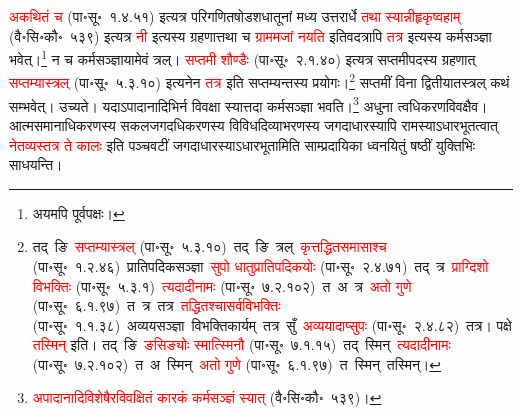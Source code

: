 \begin{sloppypar}
\textcolor{red}{अकथितं च} (पा॰सू॰~१.४.५१) इत्यत्र परिगणित\-षोडश\-धातूनां मध्य उत्तरार्धे \textcolor{red}{तथा स्यान्नीहृकृष्वहाम्‌} (वै॰सि॰कौ॰~५३९) इत्यत्र \textcolor{red}{नी} इत्यस्य ग्रहणात्तथा च \textcolor{red}{ग्राममजां नयति} इतिवदत्रापि \textcolor{red}{तत्र} इत्यस्य कर्म\-सञ्ज्ञा भवेत्।\footnote{अयमपि पूर्वपक्षः।} न च कर्म\-सञ्ज्ञायामेवं त्रल्। \textcolor{red}{सप्तमी शौण्डैः} (पा॰सू॰~२.१.४०) इत्यत्र सप्तमी\-पदस्य ग्रहणात् \textcolor{red}{सप्तम्यास्त्रल्‌} (पा॰सू॰~५.३.१०) इत्यनेन \textcolor{red}{तत्र} इति सप्तम्यन्तस्य प्रयोगः।\footnote{तद्~ङि~\arrow \textcolor{red}{सप्तम्यास्त्रल्‌} (पा॰सू॰~५.३.१०)~\arrow तद्~ङि~त्रल्~\arrow \textcolor{red}{कृत्तद्धित\-समासाश्च} (पा॰सू॰~१.२.४६)~\arrow प्रातिपदिक\-सञ्ज्ञा~\arrow \textcolor{red}{सुपो धातु\-प्रातिपदिकयोः} (पा॰सू॰~२.४.७१)~\arrow तद्~त्र~\arrow \textcolor{red}{प्राग्दिशो विभक्तिः} (पा॰सू॰~५.३.१)~\arrow \textcolor{red}{त्यदादीनामः} (पा॰सू॰~७.२.१०२)~\arrow त~अ~त्र~\arrow \textcolor{red}{अतो गुणे} (पा॰सू॰~६.१.९७)~\arrow त~त्र~\arrow तत्र~\arrow \textcolor{red}{तद्धितश्चासर्व\-विभक्तिः} (पा॰सू॰~१.१.३८)~\arrow अव्यय\-सञ्ज्ञा~\arrow विभक्ति\-कार्यम्~\arrow तत्र~सुँ~\arrow \textcolor{red}{अव्ययादाप्सुपः} (पा॰सू॰~२.४.८२)~\arrow तत्र। पक्षे \textcolor{red}{तस्मिन्} इति। तद्~ङि~\arrow \textcolor{red}{ङसिङ्योः स्मात्स्मिनौ} (पा॰सू॰~७.१.१५)~\arrow तद्~स्मिन्~\arrow \textcolor{red}{त्यदादीनामः} (पा॰सू॰~७.२.१०२)~\arrow त~अ~स्मिन्~\arrow \textcolor{red}{अतो गुणे} (पा॰सू॰~६.१.९७)~\arrow त~स्मिन्~\arrow तस्मिन्।} सप्तमीं विना द्वितीयातस्त्रल् कथं सम्भवेत्। उच्यते। यदाऽपादानादिभिर्न विवक्षा स्यात्तदा कर्म\-सञ्ज्ञा भवति।\footnote{\textcolor{red}{अपादानादि\-विशेषैरविवक्षितं कारकं कर्म\-सञ्ज्ञं स्यात्‌} (वै॰सि॰कौ॰~५३९)।} अधुना त्वधिकरण\-विवक्षैव। आत्म\-समानाधिकरणस्य सकल\-जगदधिकरणस्य विविध\-दिव्याभरणस्य जगदाधारस्यापि रामस्याऽधार\-भूतत्वात् \textcolor{red}{नेतव्यस्तत्र ते कालः} इति पञ्चवटीं जगदाधारस्याऽधारभूतामिति साम्प्रदायिका ध्वनयितुं षष्ठीं युक्तिभिः साधयन्ति।\end{sloppypar}
